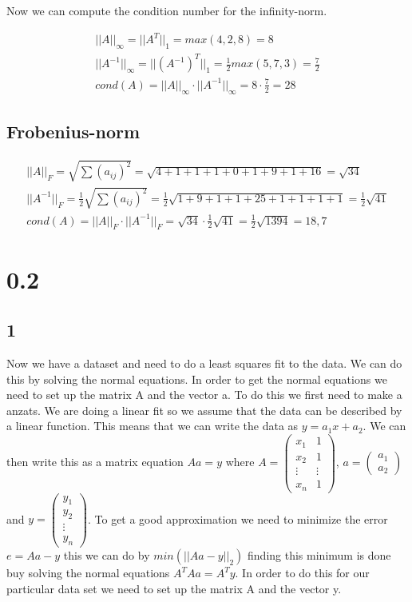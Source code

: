 \documentclass[a4paper]{article}
\begin{document}
Now we can compute the condition number for the infinity-norm.

\begin{align*}
    ||A||_{\infty} = ||A^T||_1 = max(4,2,8) = 8\\
    ||A^{-1}||_{\infty} = ||(A^{-1})^T||_1 = \frac{1}{2} max(5,7, 3) = \frac{7}{2}\\
    cond(A) = ||A||_{\infty} \cdot ||A^{-1}||_{\infty} = 8 \cdot \frac{7}{2} = 28
\end{align*}

\subsection*{Frobenius-norm}
\begin{align*}
    ||A||_F = \sqrt{\sum (a_{ij})^2} = \sqrt{4+1+1+1+0+1+9+1+16} = \sqrt{34}\\
    ||A^{-1}||_F = \frac{1}{2} \sqrt{\sum (a_{ij})^2} = \frac{1}{2} \sqrt{1+9+1+1+25+1+1+1+1} = \frac{1}{2} \sqrt{41}\\
    cond(A) = ||A||_F \cdot ||A^{-1}||_F = \sqrt{34} \cdot \frac{1}{2} \sqrt{41} = \frac{1}{2} \sqrt{1394} = 18,7
\end{align*}

\section*{0.2}

\subsection*{1}

Now we have a dataset and need to do a least squares fit to the data. We can do this by solving the normal equations. In order to get the normal equations we need to set up the matrix A and the vector a. To do this we first need to make a anzats. We are doing a linear fit so we assume that the data can be described by a linear function. This means that we can write the data as $y = a_1x + a_2$. We can then write this as a matrix equation $Aa = y$ where $A = \begin{pmatrix} x_1 & 1 \\ x_2 & 1 \\ \vdots & \vdots \\ x_n & 1 \end{pmatrix}$, $a = \begin{pmatrix} a_1 \\ a_2 \end{pmatrix}$ and $y = \begin{pmatrix} y_1 \\ y_2 \\ \vdots \\ y_n \end{pmatrix}$. To get a good approximation we need to minimize the error $e = Aa - y$ this we can do by $min(||Aa-y||_2)$ finding this minimum is done buy  solving the normal equations $A^T A a = A^Ty$. In order to do this for our particular data set we need to set up the matrix A and the vector y.
\end{document}
